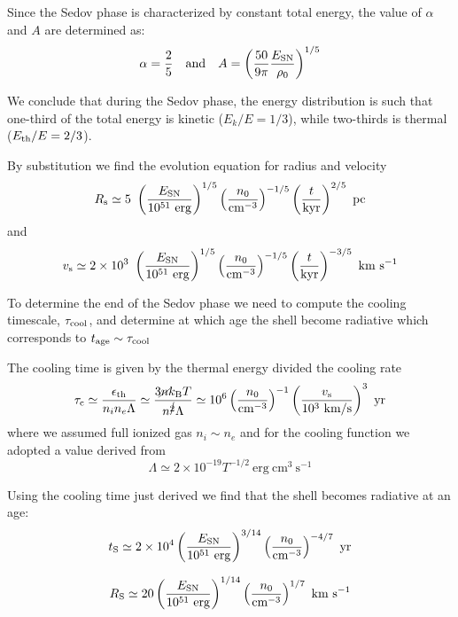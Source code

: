 Since the Sedov phase is characterized by constant total energy, the value of \( \alpha \) and \( A \) are determined as:
%
\[ 
\alpha = \frac{2}{5} \quad \text{and} \quad A = \left( \frac{50}{9\pi} \frac{E_{\rm SN}}{\rho_0} \right)^{1/5} 
\]

We conclude that during the Sedov phase, the energy distribution is such that one-third of the total energy is kinetic (\( E_k / E = 1/3 \)), while two-thirds is thermal (\( E_{\rm th} / E = 2/3 \)). 



By substitution we find the evolution equation for radius and velocity
%
\[
R_{\rm s} \simeq 5~\left(\frac{E_{\rm SN}}{10^{51}~\text{erg}}\right)^{1/5} \left(\frac{n_0}{\text{cm}^{-3}}\right)^{-1/5} \left(\frac{t}{\text{kyr}}\right)^{2/5}~\text{pc}
\]
%
and
%
\[
v_{\rm s} \simeq 2 \times 10^3~\left(\frac{E_{\rm SN}}{10^{51}~\text{erg}}\right)^{1/5} \left(\frac{n_0}{\text{cm}^{-3}}\right)^{-1/5} \left(\frac{t}{\text{kyr}}\right)^{-3/5}~\text{km}~\text{s}^{-1}
\]

To determine the end of the Sedov phase we need to compute the cooling timescale, \( \tau_{\rm cool} \), and determine at which age the shell become radiative which corresponds to \( t_{\rm age} \sim \tau_{\rm cool} \)

The cooling time is given by the thermal energy divided the cooling rate
%
\[
\tau_{\rm c} \simeq \frac{\epsilon_{\rm th}}{n_i n_e \Lambda} \simeq \frac{3 \cancel{n} k_{\rm B} T}{n^{\cancel{2}} \Lambda} \simeq 10^6 \left( \frac{n_0}{\text{cm}^{-3}} \right)^{-1} \left( \frac{v_{\rm s}}{10^3~\text{km/s}} \right)^3~\text{yr}
\]
%
where we assumed full ionized gas \( n_i \sim n_e \) and for the cooling function we adopted a value derived from~\cite{}
%
\[
\Lambda \simeq 2 \times 10^{-19} T^{-1/2}~\text{erg}~\text{cm}^3~\text{s}^{-1}
\]

Using the cooling time just derived we find that the shell becomes radiative at an age:
%
\[
t_{\rm S} \simeq 2 \times 10^4 \left( \frac{E_{\rm SN}}{10^{51}~\text{erg}}\right)^{3/14} \left( \frac{n_0}{\text{cm}^{-3}} \right)^{-4/7}~\text{yr}
\]

\[
R_{\rm S} \simeq 20 \left( \frac{E_{\rm SN}}{10^{51}~\text{erg}} \right)^{1/14} \left( \frac{n_0}{\text{cm}^{-3}} \right)^{1/7}~\text{km}~\text{s}^{-1}
\]


